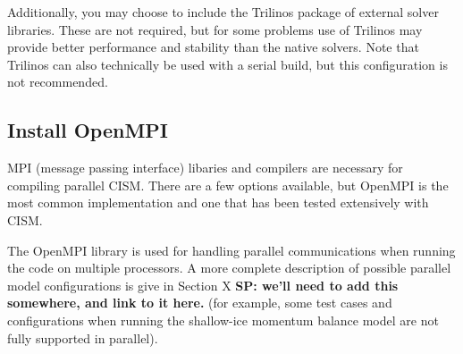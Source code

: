 Additionally, you may choose to include the Trilinos package of external solver libraries.  
These are not required, but for some problems use of Trilinos may provide better
performance and stability than the native solvers.  Note that Trilinos can also technically be 
used with a serial build, but this configuration is not recommended.

\subsection{Install OpenMPI}
MPI (message passing interface) libaries and compilers are necessary for compiling parallel CISM.  
There are a few options available, but OpenMPI is the most common implementation and one that has been 
tested extensively with CISM.

The OpenMPI library is used for handling parallel communications when running the 
code on multiple processors. A more complete description of possible parallel model configurations is give in Section X \textbf{SP: we'll need to add this somewhere, and link to it here.} 
(for example, some test cases and configurations when running the shallow-ice 
momentum balance model are not fully supported in parallel). 


